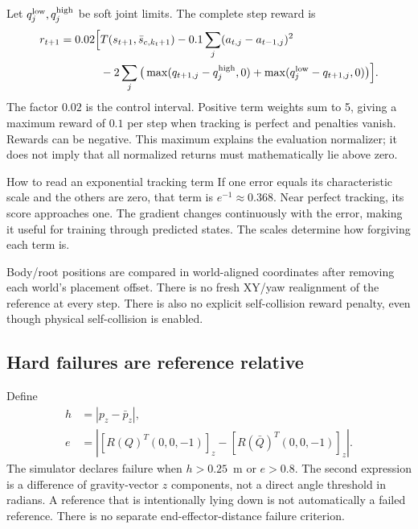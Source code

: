 \documentclass[11pt,a4paper]{article}
\begin{document}
Let $q_j^{\rm low},q_j^{\rm high}$ be soft joint limits. The complete step reward is
\begin{align}\label{eq:reward}
r_{t+1}=0.02\Big[&T(s_{t+1},\bar s_{c,k_t+1})
-0.1\sum_j(a_{t,j}-a_{t-1,j})^2\\
&-2\sum_j\big(\max(q_{t+1,j}-q_j^{\rm high},0)
+\max(q_j^{\rm low}-q_{t+1,j},0)\big)\Big].\nonumber
\end{align}
The factor $0.02$ is the control interval. Positive term weights sum to 5, giving
a maximum reward of $0.1$ per step when tracking is perfect and penalties vanish.
Rewards can be negative. This maximum explains the evaluation normalizer; it
does not imply that all normalized returns must mathematically lie above zero.

\begin{idea}{How to read an exponential tracking term}
If one error equals its characteristic scale and the others are zero, that term
is $e^{-1}\approx0.368$. Near perfect tracking, its score approaches one. The
gradient changes continuously with the error, making it useful for training
through predicted states. The scales determine how forgiving each term is.
\end{idea}

Body/root positions are compared in world-aligned coordinates after removing
each world's placement offset. There is no fresh XY/yaw realignment of the
reference at every step. There is also no explicit self-collision reward penalty,
even though physical self-collision is enabled.

\subsection{Hard failures are reference relative}
Define
\begin{align}
h&=|p_z-\bar p_z|,\\
e&=|[R(Q)^T(0,0,-1)]_z-[R(\bar Q)^T(0,0,-1)]_z|.
\end{align}
The simulator declares failure when $h>0.25$~m or $e>0.8$. The second expression
is a difference of gravity-vector $z$ components, not a direct angle threshold
in radians. A reference that is intentionally lying down is not automatically
a failed reference. There is no separate end-effector-distance failure criterion.
\end{document}
